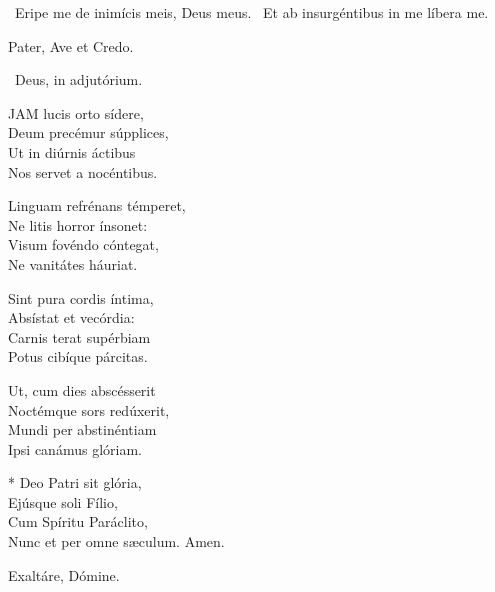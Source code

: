 \V\ Eripe me de inimícis meis, Deus meus. \R\ Et ab insurgéntibus in me líbera me.




\sectionornament



Pater, Ave et Credo.

\V\ Deus, in adjutórium.


\lettrine[lines=2]{J}{AM} lucis orto sídere,\\
Deum precémur súpplices,\\
Ut in diúrnis áctibus\\
Nos servet a nocéntibus.

Linguam refrénans témperet,\\
Ne litis horror ínsonet:\\
Visum fovéndo cóntegat,\\
Ne vanitátes háuriat.

Sint pura cordis íntima,\\
Absístat et vecórdia:\\
Carnis terat supérbiam\\
Potus cibíque párcitas.

Ut, cum dies abscésserit\\
Noctémque sors redúxerit,\\
Mundi per abstinéntiam\\
Ipsi canámus glóriam.

* Deo Patri sit glória,\\
Ejúsque soli Fílio,\\
Cum Spíritu Paráclito,\\
Nunc et per omne sæculum. Amen.

  Exaltáre, Dómine.

